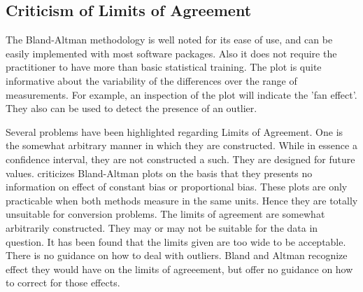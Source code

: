 \documentclass[12pt, a4paper]{report}
\theoremstyle{plain}
\theoremstyle{definition}
\theoremstyle{remark}
\begin{document}


\subsection{Criticism of Limits of Agreement }
The Bland-Altman methodology is well noted for its ease of use,
and can be easily implemented with most software packages. Also it
does not require the practitioner to have more than basic
statistical training. The plot is quite informative about the
variability of the differences over the range of measurements. For
example, an inspection of the plot will indicate the 'fan effect'.
They also can be used to detect the presence of an outlier.


Several problems have been highlighted regarding Limits of Agreement. One is the somewhat arbitrary manner in which they are
constructed. While in essence a confidence interval, they are not constructed a such. They are designed for future values.
\citet{ludbrook97,ludbrook02} criticizes Bland-Altman plots on the
basis that they presents no information on effect of constant bias
or proportional bias. These plots are only practicable when both
methods measure in the same units. Hence they are totally
unsuitable for conversion problems. The limits of agreement are
somewhat arbitrarily constructed. They may or may not be suitable
for the data in question. It has been found that the limits given
are too wide to be acceptable. There is no guidance on how to deal
with outliers. Bland and Altman recognize effect they would have
on the limits of agreeement, but offer no guidance on how to
correct for those effects.	
\end{document}
